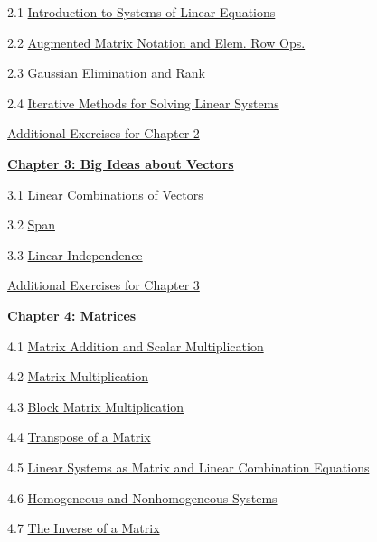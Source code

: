 \documentclass{ximera}
\begin{document}
2.1	\href{https://ximera.osu.edu/oerlinalg/LinearAlgebra/SYS-0020/main}{Introduction to Systems of Linear Equations}
	
2.2	\href{https://ximera.osu.edu/oerlinalg/LinearAlgebra/SYS-0030/main}{Augmented Matrix Notation and Elem. Row Ops.}
	
2.3	\href{https://ximera.osu.edu/oerlinalg/LinearAlgebra/SYS-0030/main}{Gaussian Elimination and Rank}
	
2.4	\href{https://ximera.osu.edu/oerlinalg/LinearAlgebra/SYS-0040/main}{Iterative Methods for Solving Linear Systems}
	
\href{https://ximera.osu.edu/oerlinalg/LinearAlgebra/SUPX-0020/main}{Additional Exercises for Chapter 2}
	
\href{https://ximera.osu.edu/oerlinalg/LinearAlgebra/XLAChapter_bigIdeas/main}{\textbf{Chapter 3: Big Ideas about Vectors}}
	
3.1	\href{https://ximera.osu.edu/oerlinalg/LinearAlgebra/VEC-0040/main}{Linear Combinations of Vectors}
	
3.2	\href{https://ximera.osu.edu/oerlinalg/LinearAlgebra/VEC-0090/main}{Span}
	
3.3	\href{https://ximera.osu.edu/oerlinalg/LinearAlgebra/VEC-0100/main}{Linear Independence}
	
\href{https://ximera.osu.edu/oerlinalg/LinearAlgebra/SUPX-0030/main}{Additional Exercises for Chapter 3}
	
\href{https://ximera.osu.edu/oerlinalg/LinearAlgebra/XLAChapter_matrices/main}{\textbf{Chapter 4: Matrices}}
	
4.1	\href{https://ximera.osu.edu/oerlinalg/LinearAlgebra/MAT-0010/main}{Matrix Addition and Scalar Multiplication}
	
4.2	\href{https://ximera.osu.edu/oerlinalg/LinearAlgebra/MAT-0020/main}{Matrix Multiplication}
	
4.3	\href{https://ximera.osu.edu/oerlinalg/LinearAlgebra/MAT-0023/main}{Block Matrix Multiplication}
	
4.4	\href{https://ximera.osu.edu/oerlinalg/LinearAlgebra/MAT-0025/main}{Transpose of a Matrix}
	
4.5	\href{https://ximera.osu.edu/oerlinalg/LinearAlgebra/MAT-0030/main}{Linear Systems as Matrix and Linear Combination Equations}
	
4.6	\href{https://ximera.osu.edu/oerlinalg/LinearAlgebra/SYS-0050/main}{Homogeneous and Nonhomogeneous Systems}

4.7	\href{https://ximera.osu.edu/oerlinalg/LinearAlgebra/MAT-0050/main}{The Inverse of a Matrix}
	
\end{document}
